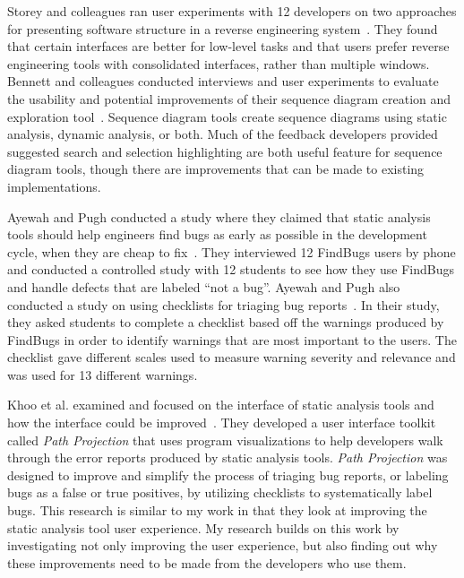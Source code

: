 Storey and colleagues ran user experiments with 12 developers on two approaches for presenting software structure in a reverse engineering system~\cite{storey1997rigi}. They found that certain interfaces are better for low-level tasks and that users prefer reverse engineering tools with consolidated interfaces, rather than multiple windows.
Bennett and colleagues conducted interviews and user experiments to evaluate the usability and potential improvements of their sequence diagram creation and exploration tool~\cite{bennett2008survey}. Sequence diagram tools create sequence diagrams using static analysis, dynamic analysis, or both.
Much of the feedback developers provided suggested search and selection highlighting are both useful feature for sequence diagram tools, though there are improvements that can be made to existing implementations.


Ayewah and Pugh conducted a study where they claimed that static analysis tools
should help engineers find bugs as early as possible in the development cycle,
when they are cheap to fix~\cite{Ayewah:2008:FBSurvey}. They interviewed 12
FindBugs users by phone and conducted a controlled study with 12 students to see
how they use FindBugs and handle defects that are labeled ``not a bug''. 
Ayewah and Pugh also conducted a study on using checklists for triaging bug
reports~\cite{Ayewah:2009:Checklists}. In their study, they asked students to
complete a checklist based off the warnings produced by FindBugs in order to
identify warnings that are most important to the users. The checklist gave
different scales used to measure warning severity and relevance and was used
for 13 different warnings.

Khoo et al. examined and focused on the interface of static analysis tools and
how the interface could be improved~\cite{Khoo:2008:PathProjection}. They
developed a user interface toolkit called \emph{Path Projection} that uses
program visualizations to help developers walk through the error reports
produced by static analysis tools.
\emph{Path Projection} was designed to improve and simplify the process of
triaging bug reports, or labeling bugs as a false or true positives, by
utilizing checklists to systematically label bugs. This research is similar to my
work in that they look at improving the static analysis tool user experience.
My research builds on this work by investigating not only improving the user
experience, but also finding out why these improvements need to be made from the
developers who use them.


